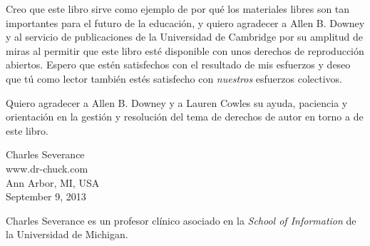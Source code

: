 Creo que este libro sirve como ejemplo de por qué los materiales libres
son tan importantes para el futuro de la educación,
y quiero agradecer a Allen B. Downey y al servicio de publicaciones de
la Universidad de Cambridge por su amplitud de miras al permitir
que este libro esté disponible con unos derechos de reproducción abiertos.
Espero que estén satisfechos con el resultado de mis esfuerzos y deseo
que tú como lector también estés satisfecho con \emph{nuestros}
esfuerzos colectivos.

Quiero agradecer a Allen B. Downey y a Lauren Cowles su ayuda,
paciencia y orientación en la gestión y resolución del tema
de derechos de autor en torno a de este libro.

Charles Severance\\
www.dr-chuck.com\\
Ann Arbor, MI, USA\\
September 9, 2013

Charles Severance es un
profesor clínico asociado
en la \emph{School of Information} de la Universidad de Michigan.

\clearemptydoublepage

\begin{latexonly}

\tableofcontents

\clearemptydoublepage

\end{latexonly}

\mainmatter

